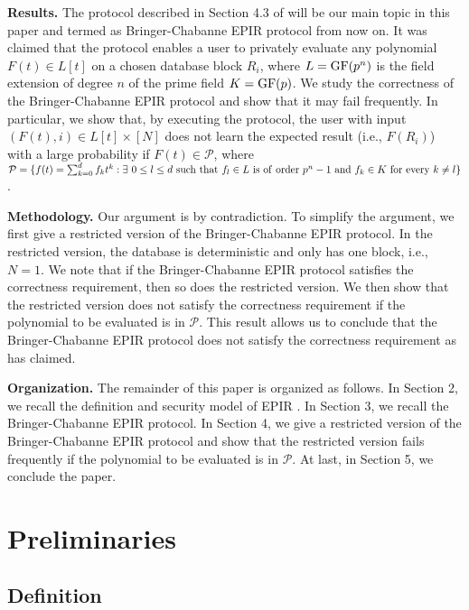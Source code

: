\documentclass[JMC]{degruyter-journal}
\begin{document}
{\bf Results.} The protocol described in Section 4.3 of \cite{BC09}
will be our main topic in this paper and termed as Bringer-Chabanne
EPIR protocol   from now on. It was claimed \cite{BC09} that the
protocol enables  a user to privately evaluate any polynomial
$F(t)\in L[t]$ on a chosen  database block $R_i$, where $L={\rm
GF}(p^n)$ is the field extension of degree $n$ of the prime field
$K={\rm GF}(p)$. We study the correctness of the Bringer-Chabanne
EPIR protocol   and show that it may fail frequently. In particular,
we show that, by executing the protocol,  the user with input
$(F(t),i)\in L[t]\times [N]$
 does not
learn the expected result (i.e., $F(R_i)$) with a large probability
if $F(t)\in \mathcal{P}$, where $
\mathcal{P}=\{f(t)=\sum_{k=0}^{d}f_kt^k: \exists~ 0\leq l\leq
d{\rm ~such~that~}f_{l}\in L{\rm~is~of~order~}
p^n-1{\rm~and~}f_k\in K{\rm ~for~every~}k\neq l\} $.




{\bf Methodology.} Our argument is by contradiction. To simplify the
argument, we first give a restricted version of the Bringer-Chabanne
EPIR protocol.  In the restricted version, the database is
deterministic and only has one block, i.e., $N=1$. We
note that if the Bringer-Chabanne EPIR protocol satisfies the
correctness requirement, then so does the restricted version. We
then show that the restricted version does not satisfy the
correctness requirement if the polynomial to be evaluated is in
$\mathcal{P}$. This result allows us to conclude that the
Bringer-Chabanne EPIR protocol   does not satisfy the correctness
requirement as \cite{BC09} has claimed.

{\bf Organization.} The remainder of this paper  is organized as
follows. In Section 2, we recall the definition and security model
of EPIR \cite{BC09}. In Section 3, we recall the Bringer-Chabanne
EPIR protocol. In Section 4, we give a restricted version of the
Bringer-Chabanne EPIR protocol   and   show that the restricted
version fails frequently if the polynomial to be evaluated is in
$\mathcal{P}$. At last, in Section 5, we conclude the paper.


\section{Preliminaries}



\subsection{Definition}
\end{document}
